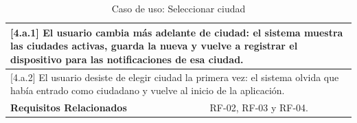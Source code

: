 \begin{table}[h!]
\begin{tabular}{|p{4cm}|p{11cm}|}
        \hline
        \multicolumn{2}{|p{15cm}|}{ [4.a.1] El usuario cambia más adelante de ciudad: el sistema muestra las ciudades activas, guarda la nueva y vuelve a registrar el dispositivo para las notificaciones de esa ciudad. } \\
        \hline
        \multicolumn{2}{|p{15cm}|}{ [4.a.2] El usuario desiste de elegir ciudad la primera vez: el sistema olvida que había entrado como ciudadano y vuelve al inicio de la aplicación. } \\
        \hline
        \textbf{Requisitos Relacionados} & RF-02, RF-03 y RF-04. \\
        \hline
    \end{tabular}
    \caption{Caso de uso: Seleccionar ciudad}
\end{table}

\begin{table}[h!]
    \centering
    \renewcommand{\arraystretch}{1.5}


\end{table}
